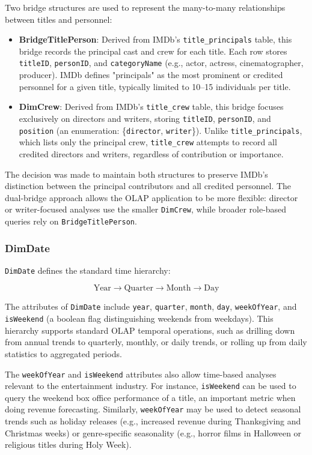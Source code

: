 Two bridge structures are used to represent the many-to-many relationships between titles and personnel:

\begin{itemize}
    \item \textbf{BridgeTitlePerson}: Derived from IMDb's \texttt{title\_principals} table, this bridge records the principal cast and crew for each title. Each row stores \texttt{titleID}, \texttt{personID}, and \texttt{categoryName} (e.g., actor, actress, cinematographer, producer). IMDb defines "principals" as the most prominent or credited personnel for a given title, typically limited to 10–15 individuals per title.
    
    \item \textbf{DimCrew}: Derived from IMDb's \texttt{title\_crew} table, this bridge focuses exclusively on directors and writers, storing \texttt{titleID}, \texttt{personID}, and \texttt{position} (an enumeration: \{\texttt{director}, \texttt{writer}\}). Unlike \texttt{title\_principals}, which lists only the principal crew, \texttt{title\_crew} attempts to record all credited directors and writers, regardless of contribution or importance.
\end{itemize}

The decision was made to maintain both structures to preserve IMDb’s distinction between the principal contributors and all credited personnel. The dual-bridge approach allows the OLAP application to be more flexible: director or writer-focused analyses use the smaller \texttt{DimCrew}, while broader role-based queries rely on \texttt{BridgeTitlePerson}.

\subsubsection{DimDate}

\texttt{DimDate} defines the standard time hierarchy:

\[
\text{Year} \rightarrow \text{Quarter} \rightarrow \text{Month} \rightarrow \text{Day}
\]

The attributes of \texttt{DimDate} include \texttt{year}, \texttt{quarter}, \texttt{month}, \texttt{day}, \texttt{weekOfYear}, and \texttt{isWeekend} (a boolean flag distinguishing weekends from weekdays). This hierarchy supports standard OLAP temporal operations, such as drilling down from annual trends to quarterly, monthly, or daily trends, or rolling up from daily statistics to aggregated periods.

The \texttt{weekOfYear} and \texttt{isWeekend} attributes also allow time-based analyses relevant to the entertainment industry. For instance, \texttt{isWeekend} can be used to query the weekend box office performance of a title, an important metric when doing revenue forecasting. Similarly, \texttt{weekOfYear} may be used to detect seasonal trends such as holiday releases (e.g., increased revenue during Thanksgiving and Christmas weeks) or genre-specific seasonality (e.g., horror films in Halloween or religious titles during Holy Week).

